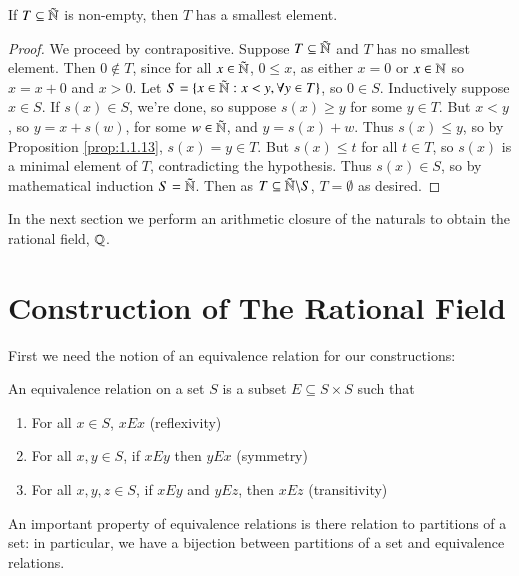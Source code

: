 \begin{theorem}\label{namthm:wellOrder}
    If $T \subseteq \tilde{\mathbb N}$ is non-empty, then $T$ has a smallest element.
\end{theorem}
\begin{proof}
    We proceed by contrapositive. Suppose $T \subseteq \tilde{\mathbb N}$ and $T$ has no smallest element. Then $0 \notin T$, since for all $x \in \tilde{\mathbb N}$, $0 \leq x$, as either $x = 0$ or $x \in \mathbb N$ so $x = x+0$ and $x > 0$. Let $S = \{x \in \tilde{\mathbb N}:x < y,\forall y \in T\}$, so $0 \in S$. Inductively suppose $x \in S$. If $s(x) \in S$, we're done, so suppose $s(x) \geq y$ for some $y \in T$. But $x < y$, so $y = x+s(w)$, for some $w \in \tilde{\mathbb N}$, and $y = s(x)+w$. Thus $s(x) \leq y$, so by Proposition \ref{prop:1.1.13}, $s(x) = y \in T$. But $s(x) \leq t$ for all $t \in T$, so $s(x)$ is a minimal element of $T$, contradicting the hypothesis. Thus $s(x) \in S$, so by mathematical induction $S = \tilde{\mathbb N}$. Then as $T \subseteq \tilde{\mathbb N}\backslash S$, $T = \emptyset$ as desired.
\end{proof}

In the next section we perform an arithmetic closure of the naturals to obtain the rational field, $\mathbb Q$.


\section{Construction of The Rational Field}

First we need the notion of an equivalence relation for our constructions:

\begin{definition}
    An equivalence relation on a set $S$ is a subset $E \subseteq S\times S$ such that \begin{enumerate}
        \item For all $x \in S$, $xEx$ (reflexivity) 
        \item For all $x,y \in S$, if $xEy$ then $yEx$ (symmetry) 
        \item For all $x,y,z \in S$, if $xEy$ and $yEz$, then $xEz$ (transitivity)
    \end{enumerate}
\end{definition}

An important property of equivalence relations is there relation to partitions of a set: in particular, we have a bijection between partitions of a set and equivalence relations.

